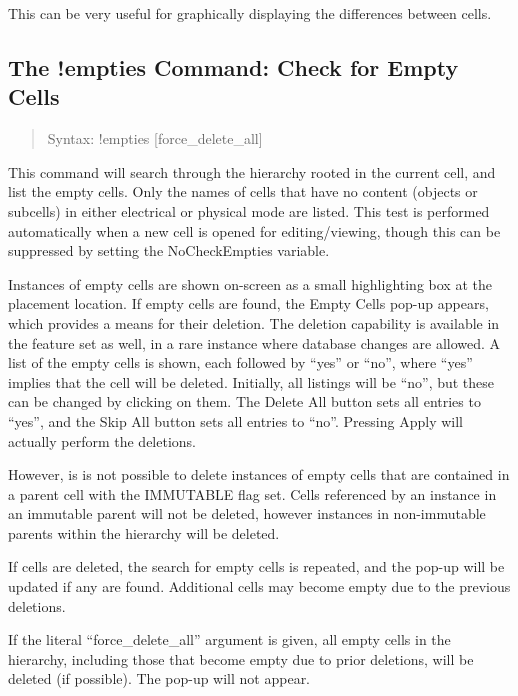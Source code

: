 This can be very useful for graphically displaying the differences
between cells.

\subsection{The {\cb !empties} Command: Check for Empty Cells}
\begin{quote}
Syntax: {\vt !empties} [{\vt force\_delete\_all}]
\end{quote}
This command will search through the hierarchy rooted in the current
cell, and list the empty cells.  Only the names of cells that have no
content (objects or subcells) in either electrical or physical mode
are listed.  This test is performed automatically when a new cell is
opened for editing/viewing, though this can be suppressed by setting
the {\et NoCheckEmpties} variable.

Instances of empty cells are shown on-screen as a small highlighting
box at the placement location.  If empty cells are found, the {\cb
Empty Cells} pop-up appears, which provides a means for their
deletion.  The deletion capability is available in the {\Xiv} feature
set as well, in a rare instance where database changes are allowed.  A
list of the empty cells is shown, each followed by ``yes'' or ``no'',
where ``yes'' implies that the cell will be deleted.  Initially, all
listings will be ``no'', but these can be changed by clicking on them. 
The {\cb Delete All} button sets all entries to ``yes'', and the {\cb
Skip All} button sets all entries to ``no''.  Pressing {\cb Apply}
will actually perform the deletions.

However, is is not possible to delete instances of empty cells that
are contained in a parent cell with the IMMUTABLE flag set.  Cells
referenced by an instance in an immutable parent will not be deleted,
however instances in non-immutable parents within the hierarchy will
be deleted.

If cells are deleted, the search for empty cells is repeated, and the
pop-up will be updated if any are found.  Additional cells may become
empty due to the previous deletions.

If the literal ``{\vt force\_delete\_all}'' argument is given, all
empty cells in the hierarchy, including those that become empty due to
prior deletions, will be deleted (if possible).  The pop-up will not
appear.

